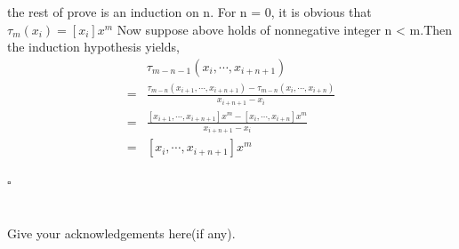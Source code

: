 \documentclass[a4paper]{article}
\begin{document}
the rest of prove is an induction on n.
For n = 0, it is obvious that $\tau_{m}(x_{i}) = [x_{i}]x^{m}$ 
Now suppose above holds of nonnegative integer n < m.Then the induction hypothesis yields,
\begin{align}
    &\tau_{m-n-1}(x_{i},\cdots,x_{i+n+1})\\
    =&\frac{\tau_{m-n}(x_{i+1},\cdots,x_{i+n+1}) - \tau_{m-n}(x_{i},\cdots,x_{i+n})}{x_{i+n+1} - x_{i}}\\
    =&\frac{[x_{i+1},\cdots,x_{i+n+1}]x^{m}-[x_{i},\cdots,x_{i+n}]x^{m}}{x_{i+n+1} - x_{i}}\\
    =&[x_{i},\cdots,x_{i+n+1}]x^{m}
\end{align}

\begin{flushright} 
    $\square$ 
\end{flushright} 

\section*{  }
Give your acknowledgements here(if any).
\end{document}
